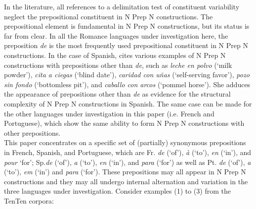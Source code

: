 \documentclass[output=paper]{langsci/langscibook}
\begin{document}
In the literature, all references to a delimitation test of constituent variability neglect the prepositional constituent in N Prep N constructions. The prepositional element is fundamental in N Prep N constructions, but its status is far from clear. In all the Romance languages under investigation here, the preposition \textit{de} is the most frequently used prepositional constituent in N Prep N constructions. In the case of Spanish, \citet{BuenafuentesdelaMata:2010} cites various examples of N Prep N constructions with prepositions other than \textit{de}, such as \textit{leche en polvo} (`milk powder'), \textit{cita a ciegas} (`blind date'), \textit{caridad con uñas} (`self-serving favor'), \textit{pozo sin fondo} (`bottomless pit'), and \textit{caballo con arcos} (`pommel horse'). She adduces the appearance of prepositions other than \textit{de} as evidence for the structural complexity of N Prep N constructions in Spanish. The same case can be made for the other languages under investigation in this paper (i.e. French and Portuguese), which show the same ability to form N Prep N constructions with other prepositions.\\
 
 This paper concentrates on a specific set of (partially) synonymous prepositions in French, Spanish, and Portuguese, which are Fr. \textit{de} (`of'), \textit{à} (`to'), \textit{en} (`in'), and \textit{pour} `for'; Sp.\textit{de} (`of'), \textit{a} (`to'), \textit {en} (`in'), and \textit{para} (`for') as well as Pt. \textit{de} (`of'), \textit{a} (`to'), \textit{em} (`in') and \textit{para} (`for'). These prepositions may all appear in N Prep N constructions and they may all undergo internal alternation and variation in the three languages under investigation. Consider examples (1) to (3) from the TenTen corpora:\\
 
\end{document}
